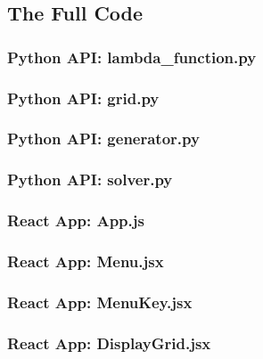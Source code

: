 \documentclass{article}
\begin{document}
\subsection{The Full Code}

\subsubsection{Python API: lambda\_function.py}


\subsubsection{Python API: grid.py}


\subsubsection{Python API: generator.py}


\subsubsection{Python API: solver.py}


\subsubsection{React App: App.js}


\subsubsection{React App: Menu.jsx}


\subsubsection{React App: MenuKey.jsx}


\subsubsection{React App: DisplayGrid.jsx}

\end{document}

